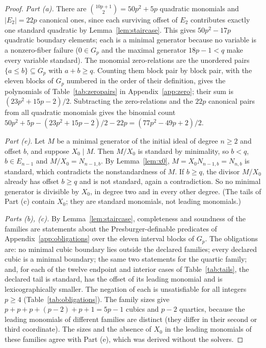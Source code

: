 \documentclass[11pt]{article}
\theoremstyle{definition}
\theoremstyle{remark}
\begin{document}
\begin{proof}
\emph{Part (a).} There are $\binom{10p+1}{2}=50p^2+5p$ quadratic monomials and $|E_2|=22p$
canonical ones, since each surviving offset of $E_2$ contributes exactly one standard
quadratic by Lemma~\ref{lem:staircase}. This gives $50p^2-17p$ quadratic boundary elements; each
is a minimal generator because no variable is a nonzero-fiber failure ($0\in G_p$ and the
maximal generator $18p-1<q$ make every variable standard). The monomial zero-relations are the
unordered pairs $\{a\leq b\}\subseteq G_p$ with $a+b\geq q$. Counting them block pair by block
pair, with the eleven blocks of $G_p$ numbered in the order of their definition, gives the
polynomials of Table~\ref{tab:zeropairs} in Appendix~\ref{app:zero}; their sum is
$(23p^2+15p-2)/2$. Subtracting the zero-relations and the $22p$ canonical pairs from all quadratic
monomials gives the binomial count $50p^2+5p-(23p^2+15p-2)/2-22p=(77p^2-49p+2)/2$.

\emph{Part (e).} Let $M$ be a minimal generator of the initial ideal of degree $n\geq2$ and offset
$b$, and suppose $X_0\mid M$. Then $M/X_0$ is standard by minimality, so $b<q$, $b\in E_{n-1}$ and
$M/X_0=N_{n-1,b}$. By Lemma~\ref{lem:x0}, $M=X_0N_{n-1,b}=N_{n,b}$ is standard, which contradicts
the nonstandardness of $M$. If $b\geq q$, the divisor $M/X_0$ already has offset $b\geq q$ and is
not standard, again a contradiction. So no minimal generator is divisible by $X_0$, in degree two
and in every other degree. (The tails of Part (c) contain $X_0$; they are standard monomials, not
leading monomials.)

\emph{Parts (b), (c).} By Lemma~\ref{lem:staircase}, completeness and soundness of the
families are statements about the Presburger-definable predicates of Appendix~\ref{app:obligations}
over the eleven interval blocks of $G_p$. The obligations are: no minimal cubic boundary lies
outside the declared families; every declared cubic is a minimal boundary; the same two
statements for the quartic family; and, for each of the twelve endpoint and interior cases of
Table~\ref{tab:tails}, the declared tail is standard, has the offset of its leading monomial and is
lexicographically smaller. The negation of each is unsatisfiable for all integers $p\geq4$
(Table~\ref{tab:obligations}). The family sizes give $p+p+p+(p-2)+p+1=5p-1$ cubics and $p-2$
quartics, because the leading monomials of different families are distinct (they differ in
their second or third coordinate). The sizes and the absence of $X_0$ in the leading monomials of
these families agree with Part (e), which was derived without the solvers.


\end{proof}
\end{document}
